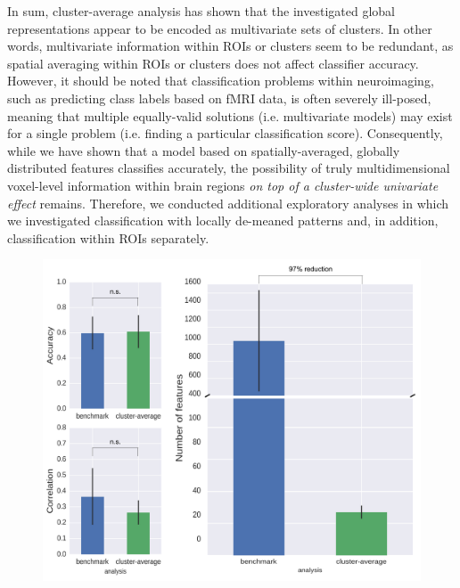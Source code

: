 \documentclass[jou,12pt,a4paper]{apa6}
\begin{document}
In sum, cluster-average analysis has shown that the investigated global representations appear to be encoded as multivariate sets of clusters. In other words, multivariate information within ROIs or clusters seem to be redundant, as spatial averaging within ROIs or clusters does not affect classifier accuracy. However, it should be noted that classification problems within neuroimaging, such as predicting class labels based on fMRI data, is often severely ill-posed, meaning that multiple equally-valid solutions (i.e. multivariate models) may exist for a single problem (i.e. finding a particular classification score). Consequently, while we have shown that a model based on spatially-averaged, globally distributed features classifies accurately, the possibility of truly multidimensional voxel-level information within brain regions \emph{on top of a cluster-wide univariate effect} remains. Therefore, we conducted additional exploratory analyses in which we investigated classification with locally de-meaned patterns and, in addition, classification within ROIs separately.  

\begin{figure}[ht]
\centering
\includegraphics[width=\textwidth]{overview_plot}
\end{figure}
\end{document}
